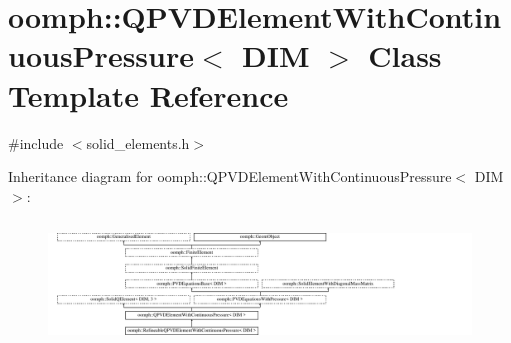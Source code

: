 \hypertarget{classoomph_1_1QPVDElementWithContinuousPressure}{}\section{oomph\+:\+:Q\+P\+V\+D\+Element\+With\+Continuous\+Pressure$<$ D\+IM $>$ Class Template Reference}
\label{classoomph_1_1QPVDElementWithContinuousPressure}


{\ttfamily \#include $<$solid\+\_\+elements.\+h$>$}

Inheritance diagram for oomph\+:\+:Q\+P\+V\+D\+Element\+With\+Continuous\+Pressure$<$ D\+IM $>$\+:\begin{figure}[H]
\begin{center}
\leavevmode
\includegraphics[height=3.367697cm]{classoomph_1_1QPVDElementWithContinuousPressure}
\end{center}
\end{figure}
